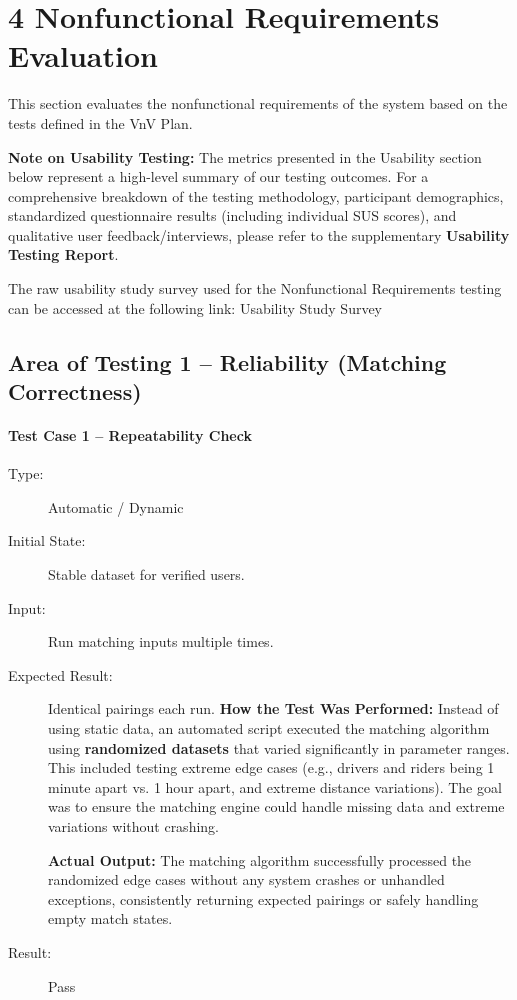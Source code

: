 \section{4 Nonfunctional Requirements Evaluation}

This section evaluates the nonfunctional requirements of the system based on the tests defined in the VnV Plan. 

\textbf{Note on Usability Testing:} The metrics presented in the Usability section below represent a high-level summary of our testing outcomes. For a comprehensive breakdown of the testing methodology, participant demographics, standardized questionnaire results (including individual SUS scores), and qualitative user feedback/interviews, please refer to the supplementary \textbf{Usability Testing Report}. 

The raw usability study survey used for the Nonfunctional Requirements testing can be accessed at the following link: Usability Study Survey
\subsection{Area of Testing 1 – Reliability (Matching Correctness)}

\paragraph{Test Case 1 – Repeatability Check} \label{test-R1-1}
\begin{description}
    \item[Type:] Automatic / Dynamic
    \item[Initial State:] Stable dataset for verified users.
    \item[Input:] Run matching inputs multiple times.
    \item[Expected Result:] Identical pairings each run.
    \textbf{How the Test Was Performed:} Instead of using static data, an automated script executed the matching algorithm using \textbf{randomized datasets} that varied significantly in parameter ranges. This included testing extreme edge cases (e.g., drivers and riders being 1 minute apart vs. 1 hour apart, and extreme distance variations). The goal was to ensure the matching engine could handle missing data and extreme variations without crashing.

\textbf{Actual Output:} The matching algorithm successfully processed the randomized edge cases without any system crashes or unhandled exceptions, consistently returning expected pairings or safely handling empty match states.
    \item[Result:] Pass
\end{description}

